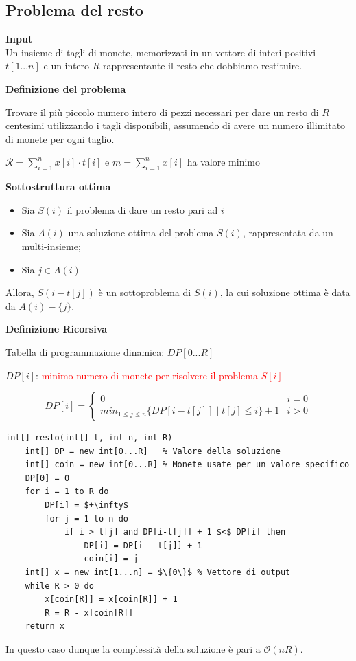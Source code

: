 \documentclass[../cheatSheetAlgoritmi.tex]{subfiles}
\begin{document}
\subsection{Problema del resto}
\textbf{Input}\\
Un insieme di tagli di monete, memorizzati in un vettore di interi positivi $t[1...n]$ e un intero $R$ rappresentante il resto che dobbiamo restituire.

\bigskip

\textbf{Definizione del problema}

Trovare il più piccolo numero intero di pezzi necessari per dare un resto di $R$ centesimi utilizzando i tagli disponibili, assumendo di avere un numero illimitato di monete per ogni taglio.
\begin{center}
	$\mathcal{R} = \sum_{i=1}^{n} x[i] \cdot t[i]$ e $m = \sum_{i = 1}^{n} x[i]$ ha valore minimo
\end{center}
\textbf{Sottostruttura ottima}
\begin{itemize}
	\item Sia $S(i)$ il problema di dare un resto pari ad $i$
	\item Sia $A(i)$ una soluzione ottima del problema $S(i)$, rappresentata da un multi-insieme; 
	\item Sia $j \in A(i)$
\end{itemize}
Allora, $S(i - t[j])$ è un sottoproblema di $S(i)$, la cui soluzione ottima è data da $A(i) - \{j\}$.

\bigskip

\textbf{Definizione Ricorsiva}

Tabella di programmazione dinamica: $DP[0...R]$

$DP[i]$: \textcolor{red}{minimo numero di monete per risolvere il problema $S[i]$}

\begin{equation*}
  	DP[i]=\begin{cases}
   		0  & \text{$i = 0$}\\
   		min_{1 \leq j \leq n}\{DP[i - t[j]] \mid t[j] \leq i\} + 1 & \text{$i > 0$}
  	\end{cases}
\end{equation*}
\begin{lstlisting}[caption=Resto (DP)]
int[] resto(int[] t, int n, int R)
	int[] DP = new int[0...R] 	% Valore della soluzione
	int[] coin = new int[0...R]	% Monete usate per un valore specifico
	DP[0] = 0
	for i = 1 to R do
		DP[i] = $+\infty$
		for j = 1 to n do
			if i > t[j] and DP[i-t[j]] + 1 $<$ DP[i] then
				DP[i] = DP[i - t[j]] + 1
				coin[i] = j
	int[] x = new int[1...n] = $\{0\}$ % Vettore di output
	while R > 0 do
		x[coin[R]] = x[coin[R]] + 1
		R = R - x[coin[R]]
	return x
\end{lstlisting}
In questo caso dunque la complessità della soluzione è pari a $\mathcal{O}(nR)$.
\end{document}
